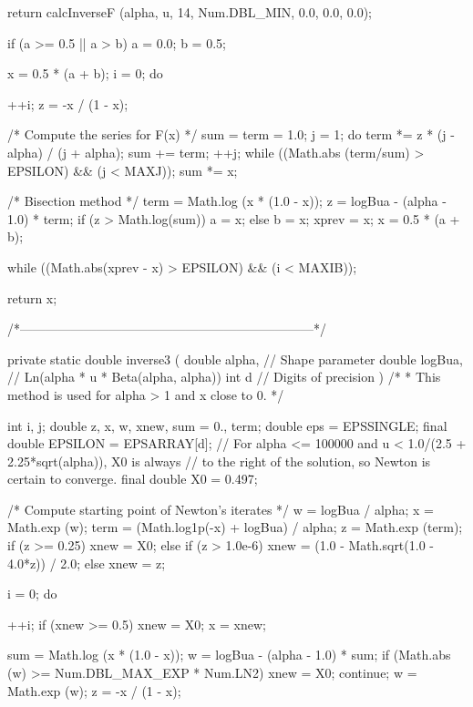 \begin{code}
\begin{hide} {
      return calcInverseF (alpha, u, 14, Num.DBL_MIN, 0.0, 0.0, 0.0);
   }
{      if (a >= 0.5 || a > b) {
         a = 0.0;
         b = 0.5;
      }

      x = 0.5 * (a + b);
      i = 0;
      do {
         ++i;
         z = -x / (1 - x);

         /* Compute the series for F(x) */
         sum = term = 1.0;
         j = 1;
         do {
            term *= z * (j - alpha) / (j + alpha);
            sum += term;
            ++j;
         } while ((Math.abs (term/sum) >  EPSILON) && (j < MAXJ));
         sum *= x;

         /* Bisection method */
         term = Math.log (x * (1.0 - x));
         z = logBua - (alpha - 1.0) * term;
         if (z > Math.log(sum))
            a = x;
         else
            b = x;
         xprev = x;
         x = 0.5 * (a + b);

      } while ((Math.abs(xprev - x) > EPSILON) && (i < MAXIB));

      return x;
   }

   /*---------------------------------------------------------------------*/

   private static double inverse3 (
      double alpha,                // Shape parameter
      double logBua,               // Ln(alpha * u * Beta(alpha, alpha))
      int d                        // Digits of precision
      )
   /*
    * This method is used for alpha > 1 and x close to 0.
    */
   {
      int i, j;
      double z, x, w, xnew, sum = 0., term;
      double eps = EPSSINGLE;
      final double EPSILON = EPSARRAY[d];
      // For alpha <= 100000 and u < 1.0/(2.5 + 2.25*sqrt(alpha)), X0 is always
      // to the right of the solution, so Newton is certain to converge.
      final double X0 = 0.497;

      /* Compute starting point of Newton's iterates */
      w = logBua / alpha;
      x = Math.exp (w);
      term = (Math.log1p(-x) + logBua) / alpha;
      z = Math.exp (term);
      if (z >= 0.25)
          xnew = X0;
      else if (z > 1.0e-6)
          xnew = (1.0 - Math.sqrt(1.0 - 4.0*z)) / 2.0;
      else
          xnew = z;

      i = 0;
      do {
         ++i;
         if (xnew >= 0.5)
             xnew = X0;
         x = xnew;

         sum = Math.log (x * (1.0 - x));
         w = logBua - (alpha - 1.0) * sum;
         if (Math.abs (w) >= Num.DBL_MAX_EXP * Num.LN2) {
            xnew = X0;
            continue;
         }
         w = Math.exp (w);
         z = -x / (1 - x);

}}
\end{hide}
\end{code}
